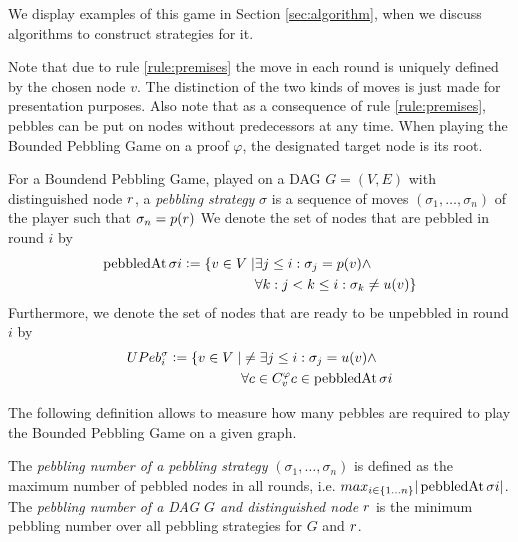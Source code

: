We display examples of this game in Section \ref{sec:algorithm}, when we discuss algorithms to construct strategies for it.

Note that due to rule \ref{rule:premises} the move in each round is uniquely defined by the chosen node $v$.
The distinction of the two kinds of moves is just made for presentation purposes.
Also note that as a consequence of rule \ref{rule:premises}, pebbles can be put on nodes without predecessors at any time.
When playing the Bounded Pebbling Game on a proof $\varphi$, the designated target node is its root.

\begin{definition}[Strategy]
\label{def:strategy}
For a Boundend Pebbling Game, played on a DAG $G = (V,E)$ with distinguished node $r$, 
a \emph{pebbling strategy} $\sigma$ is a sequence of moves $(\sigma_1,\ldots,\sigma_n)$ of the player such that $\sigma_n = p(r)$
We denote the set of nodes that are pebbled in round $i$ by 
\begin{align*}
	\operatorname{pebbledAt}{\sigma}{i} \mathrel{\mathop:}= \{ v \in V \mid	& \exists j \leq i: \sigma_j = p(v) \wedge\\
																								&\forall k: j < k \leq i: \sigma_k \neq u(v)\}
\end{align*}
Furthermore, we denote the set of nodes that are ready to be unpebbled in round $i$ by
\begin{align*}
	UPeb^{\sigma}_{i} \mathrel{\mathop:}= \{ v \in V \mid	& \neq \exists j \leq i: \sigma_j = u(v) \wedge\\
																									& \forall c \in C_{v}^{\varphi} c \in \operatorname{pebbledAt}{\sigma}{i}
\end{align*}

\end{definition}

The following definition allows to measure how many pebbles are required to play the Bounded Pebbling Game on a given graph.

\begin{definition}
The \emph{pebbling number of a pebbling strategy} $(\sigma_1,\ldots,\sigma_n)$ is defined as the maximum number of pebbled nodes in all rounds, 
i.e. $max_{i \scriptstyle \in \{1\ldots n\} \displaystyle}|\operatorname{pebbledAt}{\sigma}{i}|$.
The \emph{pebbling number of a DAG $G$ and distinguished node $r$} is the minimum pebbling number over all pebbling strategies for $G$ and $r$.
\end{definition}

